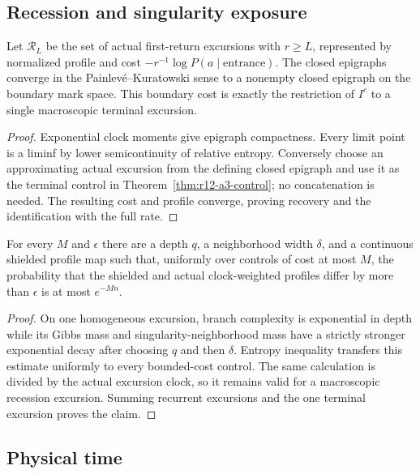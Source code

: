 \subsection{Recession and singularity exposure}

\begin{proposition}
\label{prop:r12-a3-epigraph}
Let $\mathcal R_L$ be the set of actual first-return excursions with
$r\ge L$, represented by normalized profile and cost
$-r^{-1}\log P(a\mid\text{entrance})$.  The closed epigraphs converge in the
Painlev\'e--Kuratowski sense to a nonempty closed epigraph on the boundary
mark space.  This boundary cost is exactly the restriction of $I^c$ to a
single macroscopic terminal excursion.
\end{proposition}

\begin{proof}
Exponential clock moments give epigraph compactness.  Every limit point is a
liminf by lower semicontinuity of relative entropy.  Conversely choose an
approximating actual excursion from the defining closed epigraph and use it as
the terminal control in Theorem~\ref{thm:r12-a3-control}; no concatenation is
needed.  The resulting cost and profile converge, proving recovery and the
identification with the full rate.
\end{proof}

\begin{lemma}
\label{lem:r12-a3-shield}
For every $M$ and $\epsilon$ there are a depth $q$, a neighborhood width
$\delta$, and a continuous shielded profile map such that, uniformly over
controls of cost at most $M$, the probability that the shielded and actual
clock-weighted profiles differ by more than $\epsilon$ is at most $e^{-Mn}$.
\end{lemma}

\begin{proof}
On one homogeneous excursion, branch complexity is exponential in depth while
its Gibbs mass and singularity-neighborhood mass have a strictly stronger
exponential decay after choosing $q$ and then $\delta$.  Entropy inequality
transfers this estimate uniformly to every bounded-cost control.  The same
calculation is divided by the actual excursion clock, so it remains valid for
a macroscopic recession excursion.  Summing recurrent excursions and the one
terminal excursion proves the claim.
\end{proof}

\subsection{Physical time}


